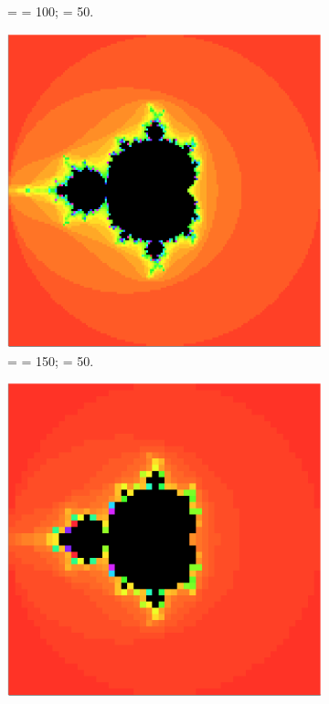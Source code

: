 \begin{figure}
\begin{subfigure}[t]{0.3\textwidth}
        \caption{ =  = 100;  = 50.}
    \end{subfigure}
    \begin{subfigure}[t]{0.3\textwidth}
        \centering
        \includegraphics[scale=0.15]{../figures/fractal-n150-mx050}
        \caption{ =  = 150;  = 50.}
    \end{subfigure}
    \begin{subfigure}[t]{0.3\textwidth}
        \centering
        \includegraphics[scale=0.15]{../figures/fractal-n050-mx100}

\end{subfigure}
\end{figure}
